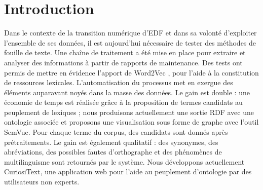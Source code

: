 \section{Introduction}
Dans le contexte de la transition numérique d’EDF et dans sa volonté d’exploiter l’ensemble de ses données, il est aujourd’hui nécessaire de tester des méthodes de fouille de texte. Une chaîne de traitement a été mise en place pour extraire et analyser des informations à partir de rapports de maintenance. Des tests ont permis de mettre en évidence l’apport de Word2Vec \cite{DBLP:journals/corr/abs-1301-3781}, pour l’aide à la constitution de ressources lexicales. L’automatisation du processus met en exergue des éléments auparavant noyés dans la masse des données. Le gain est double : une économie de temps est réalisée grâce à la proposition de termes candidats au peuplement de lexiques ; nous produisons actuellement une sortie RDF avec une ontologie associée et proposons une visualisation sous forme de graphe avec l’outil SemVue. Pour chaque terme du corpus, des candidats sont donnés après prétraitements. Le gain est également qualitatif : des synonymes, des abréviations, des possibles fautes d’orthographe et des phénomènes de multilinguisme sont retournés par le système. Nous développons actuellement CuriosiText, une application web pour l'aide au peuplement d'ontologie par des utilisateurs non experts. 
